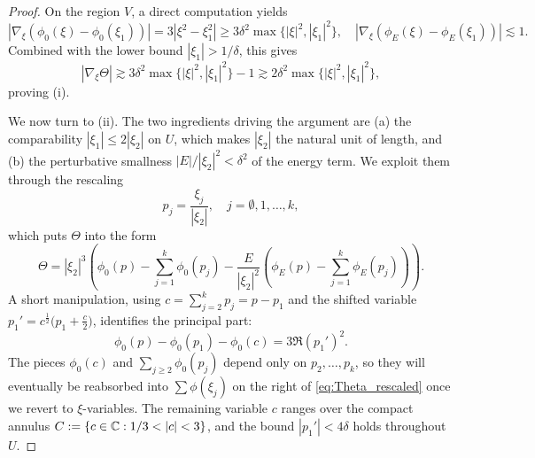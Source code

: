 \begin{proof}
On the region $V$, a direct computation yields
$$
|\nabla_\xi (\phi_0(\xi)-\phi_0(\xi_1))| = 3|\xi^2-\xi_1^2|\ge 3\delta^2\max\{|\xi|^2,|\xi_1|^2\},\quad |\nabla_\xi (\phi_E(\xi)-\phi_E(\xi_1))|\lesssim 1.
$$
Combined with the lower bound $|\xi_1|>1/\delta$, this gives
$$
|\nabla_{\xi} \Theta|\gtrsim 3\delta^2\max\{|\xi|^2,|\xi_1|^2\} - 1 \gtrsim 2\delta^2\max\{|\xi|^2,|\xi_1|^2\},
$$
proving (i).

\noi We now turn to (ii). The two ingredients driving the argument are (a) the comparability $|\xi_1|\le 2|\xi_2|$ on $U$, which makes $|\xi_2|$ the natural unit of length, and (b) the perturbative smallness $|E|/|\xi_2|^2<\delta^2$ of the energy term. We exploit them through the rescaling
$$
p_j=\frac{\xi_j}{|\xi_2|},\quad j=\emptyset, 1,\dots, k,
$$
which puts $\Theta$ into the form
\begin{equation}\label{eq:Theta_rescaled}
\Theta=|\xi_2|^3\left(\phi_0(p) - \sum_{j=1}^k \phi_0(p_j) - \frac{E}{|\xi_2|^2}\left(\phi_E(p) - \sum_{j=1}^k \phi_E(p_j)\right)\right).
\end{equation}
A short manipulation, using $c=\sum_{j=2}^k p_j=p-p_1$ and the shifted variable $p_1'=c^{\frac12}\bigl(p_1+\tfrac{c}{2}\bigr)$, identifies the principal part:
$$
\phi_0(p)-\phi_0(p_1) - \phi_0(c) = 3\Re (p_1')^2.
$$
The pieces $\phi_0(c)$ and $\sum_{j\ge 2}\phi_0(p_j)$ depend only on $p_2,\dots,p_k$, so they will eventually be reabsorbed into $\sum \phi(\xi_j)$ on the right of \eqref{eq:Theta_rescaled} once we revert to $\xi$-variables. The remaining variable $c$ ranges over the compact annulus $C:=\{c\in\CC: 1/3<|c|<3\}$, and the bound $|p_1'|<4\delta$ holds throughout $U$.


\end{proof}
